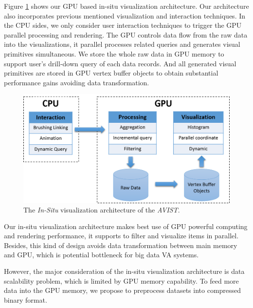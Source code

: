 \documentclass[journal]{vgtc}                %
\begin{document}
{Figure \ref{fig:architecture} shows our GPU based in-situ visualization architecture. Our architecture also incorporates previous mentioned visualization and interaction techniques. In the CPU sides, we only consider user interaction techniques to trigger the GPU parallel processing and rendering. The GPU controls data flow from the raw data into the visualizations, it parallel processes related queries and generates visual primitives simultaneous. We store the whole raw data in GPU memory to support user's drill-down query of each data records. And all generated visual primitives are stored in GPU vertex buffer objects to obtain substantial performance gains avoiding data transformation.

 

\begin{figure}[htb]
	\centering
	\includegraphics[width=1.0\linewidth]{pic/in-situ.png}
	\parbox[t]{1.0\columnwidth}{\relax
	}
	\caption{\label{fig:architecture} The \emph{In-Situ} visualization architecture of the \emph{AVIST}.}
\end{figure}

Our in-situ visualization architecture makes best use of GPU powerful computing and rendering performance, it supports to filter and visualize items in parallel. Besides, this kind of design avoids data transformation between main memory and GPU, which is potential bottleneck for big data VA systems. 


However, the major consideration of the in-situ visualization architecture is data scalability problem, which is limited by GPU memory capability. To feed more data into the GPU memory, we propose to preprocess datasets into compressed binary format.


}
\end{document}
